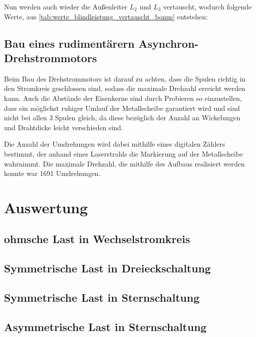 \documentclass[12pt,english,ngerman]{scrartcl}
\begin{document}
Nun werden auch wieder die Außenleiter $L_2$ und $L_3$ vertauscht, wodurch folgende Werte, aus \autoref{tab:werte_blindleistung_vertauscht_bonus} entstehen:



\subsection{Bau eines rudimentärern Asynchron-Drehstrommotors}

Beim Bau des Drehstrommotors ist darauf zu achten, dass die Spulen richtig in den Stromkreis geschlossen sind, sodass die 
maximale Drehzahl erreicht werden kann. Auch die Abstände der Eisenkerne sind durch Probieren so einzustellen, dass ein möglichst
ruhiger Umlauf der Metallscheibe garantiert wird und sind nicht bei allen 3 Spulen gleich, da diese bezüglich der Anzahl
an Wickelungen und Drahtdicke leicht verschieden sind.

Die Anzahl der Umdrehungen wird dabei mithilfe eines digitalen Zählers bestimmt, der anhand eines Laserstrahls die Markierung
auf der Metallscheibe wahrnimmt.
Die maximale Drehzahl, die mithilfe des Aufbaus realisiert werden konnte war 1691 Umdrehungen.



\section{Auswertung}
\label{sec:auswertung}

\subsection{ohmsche Last in Wechselstromkreis}


\subsection{Symmetrische Last in Dreieckschaltung}


\subsection{Symmetrische Last in Sternschaltung}


\subsection{Asymmetrische Last in Sternschaltung}
\end{document}

